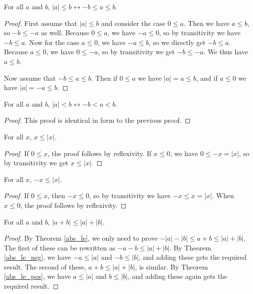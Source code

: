 \documentclass[../../math.tex]{subfiles}
\begin{document}
\begin{theorem} \label{abs_le}
    For all $a$ and $b$, $|a| \leq b \leftrightarrow -b \leq a \leq b$.
\end{theorem}
\begin{proof}
    First assume that $|a| \leq b$ and consider the case $0 \leq a$.  Then we
    have $a \leq b$, so $-b \leq -a$ as well.  Because $0 \leq a$, we have $-a
    \leq 0$, so by transitivity we have $-b \leq a$.  Now for the case $a \leq
    0$, we have $-a \leq b$, so we directly get $-b \leq a$.  Because $a \leq
    0$, we have $0 \leq -a$, so by transitivity we get $-b \leq -a$.  We thus
    have $a \leq b$.

    Now assume that $-b \leq a \leq b$.  Then if $0 \leq a$ we have $|a| = a
    \leq b$, and if $a \leq 0$ we have $|a| = -a \leq b$.
\end{proof}

\begin{theorem} \label{abs_lt}
    For all $a$ and $b$, $|a| < b \leftrightarrow -b < a < b$.
\end{theorem}
\begin{proof}
    This proof is identical in form to the previous proof.
\end{proof}

\begin{theorem} \label{abs_le_pos}
    For all $x$, $x \leq |x|$.
\end{theorem}
\begin{proof}
    If $0 \leq x$, the proof follows by reflexivity.  If $x \leq 0$, we have $0
    \leq -x = |x|$, so by transitivity we get $x \leq |x|$.
\end{proof}

\begin{theorem} \label{abs_le_neg}
    For all $x$, $-x \leq |x|$.
\end{theorem}
\begin{proof}
    If $0 \leq x$, then $-x \leq 0$, so by transitivity we have $-x \leq x =
    |x|$.  When $x \leq 0$, the proof follows by reflexivity.
\end{proof}

\begin{theorem}
    For all $a$ and $b$, $|a + b| \leq |a| + |b|$.
\end{theorem}
\begin{proof}
    By Theorem \ref{abs_le}, we only need to prove $-|a| - |b| \leq a + b \leq
    |a| + |b|$.  The first of these can be rewritten as $-a - b \leq |a| + |b|$.
    By Theorem \ref{abs_le_neg}, we have $-a \leq |a|$ and $-b \leq |b|$, and
    adding these gets the required result.  The second of these, $a + b \leq |a|
    + |b|$, is similar.  By Theorem \ref{abs_le_pos}, we have $a \leq |a|$ and
    $b \leq |b|$, and adding these again gets the required result.
\end{proof}
\end{document}
